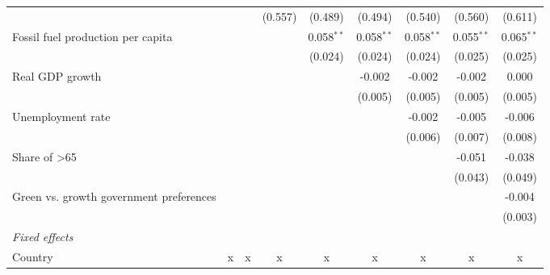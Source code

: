 \begin{table}[htbp]
\begin{tabular}{lcccccccc}
                                                              &               &         & (0.557) & (0.489)      & (0.494)      & (0.540)      & (0.560)      & (0.611)\\   
      Fossil fuel production per capita                       &               &         &         & 0.058$^{**}$ & 0.058$^{**}$ & 0.058$^{**}$ & 0.055$^{**}$ & 0.065$^{**}$\\   
                                                              &               &         &         & (0.024)      & (0.024)      & (0.024)      & (0.025)      & (0.025)\\   
      Real GDP growth                                         &               &         &         &              & -0.002       & -0.002       & -0.002       & 0.000\\   
                                                              &               &         &         &              & (0.005)      & (0.005)      & (0.005)      & (0.005)\\   
      Unemployment rate                                       &               &         &         &              &              & -0.002       & -0.005       & -0.006\\   
                                                              &               &         &         &              &              & (0.006)      & (0.007)      & (0.008)\\   
      Share of >65                                            &               &         &         &              &              &              & -0.051       & -0.038\\   
                                                              &               &         &         &              &              &              & (0.043)      & (0.049)\\   
      Green vs. growth government preferences                 &               &         &         &              &              &              &              & -0.004\\   
                                                              &               &         &         &              &              &              &              & (0.003)\\   
      \emph{Fixed effects}\\
      Country                                                 & x             & x       & x       & x            & x            & x            & x            & x\\  

\end{tabular}
\end{table}
